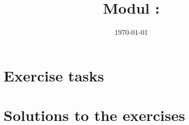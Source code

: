 \documentclass[twoside, a4paper]{article}
\title{Modul \GetItDigitalModulnumber: \GetItDigitalModulname}
\author{}
\institute{GET it digital}
\date{\today}
\begin{document}

{\setlength{\parskip}{0.05ex}    %
	\tableofcontents
	\newpage
}

\printnomenclature
\cleardoublepage

\pagestyle{fancyplain}
\setheadkapitel

\cleardoublepage




\cleardoublepage
\appendix
\setheadanhang

\section{Exercise tasks}
\renewcommand{\Aufgabe}[1]{#1}
\renewcommand{\Loesung}[1]{}


\section{Solutions to the exercises}
\renewcommand{\Aufgabe}[1]{}
\renewcommand{\Loesung}[1]{#1}


\clearpage
{}
\printbibliography

\clearpage
{}
\printindex
\end{document}
